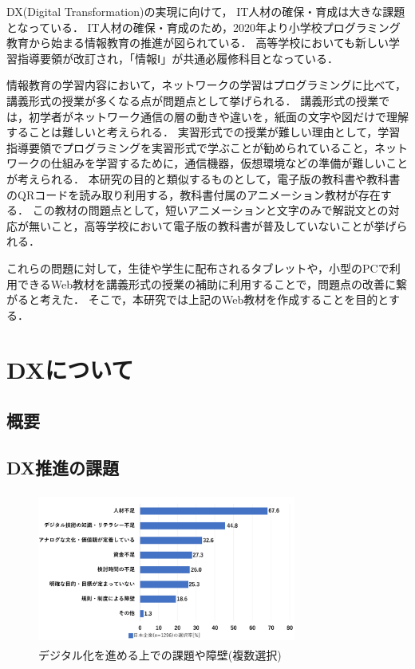 \documentclass[12pt,a4j,titlepage]{ltjsarticle}
\begin{document}
DX(Digital Transformation)の実現に向けて，%
IT人材の確保・育成は大きな課題となっている\cite{dx}．
IT人材の確保・育成のため，2020年より小学校プログラミング教育から始まる情報教育の推進が図られている．
高等学校においても新しい学習指導要領が改訂され，「情報Ⅰ」が共通必履修科目となっている．

情報教育の学習内容において，ネットワークの学習はプログラミングに比べて，講義形式の授業が多くなる点が問題点として挙げられる．
講義形式の授業では，初学者がネットワーク通信の層の動きや違いを，紙面の文字や図だけで理解することは難しいと考えられる．
実習形式での授業が難しい理由として，学習指導要領でプログラミングを実習形式で学ぶことが勧められていること，ネットワークの仕組みを学習するために，通信機器，仮想環境などの準備が難しいことが考えられる．
本研究の目的と類似するものとして，電子版の教科書や教科書のQRコードを読み取り利用する，教科書付属のアニメーション教材が存在する．
この教材の問題点として，短いアニメーションと文字のみで解説文との対応が無いこと，高等学校において電子版の教科書が普及していないことが挙げられる．

これらの問題に対して，生徒や学生に配布されるタブレットや，小型のPCで利用できるWeb教材を講義形式の授業の補助に利用することで，問題点の改善に繋がると考えた．
そこで，本研究では上記のWeb教材を作成することを目的とする．
\clearpage
\section{DXについて}
\subsection{概要}
\subsection{DX推進の課題}
\begin{figure}[h]
\centering
\includegraphics[clip,width=85mm,height=50mm]{figures/dx.pdf}
\caption[デジタル化を進める上での課題や障壁]{デジタル化を進める上での課題や障壁(複数選択)\linebreak}
\label{fig:dx}
\end{figure}
\end{document}
